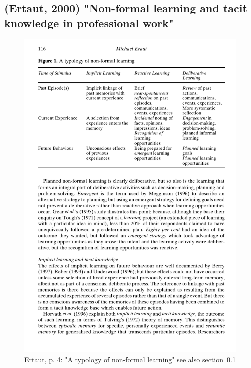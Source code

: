 \documentclass[12pt,a4paper]{article}
\begin{document}
  \subsection{(Ertaut, 2000) "Non-formal learning and tacit knowledge in professional work"} %
  \label{sec:Ertaut2000}

    \begin{figure}[htb]
      \centering
      \includegraphics[width=12cm]{Meeting 4 NON-FORMAL LEARNING - Seite 4.pdf}
      \caption{Ertaut, p. 4: "A typology of non-formal learning" see also section~\ref{sec:Ertaut2000}}
      \label{fig:Ertaut typology}
    \end{figure}
\end{document}
